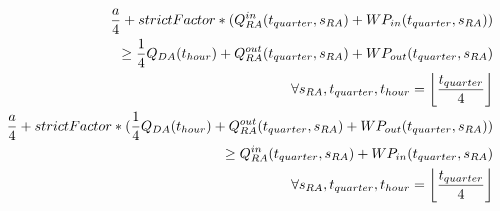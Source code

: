 \begin{alignat}{3}
	\frac{a}{4} + strictFactor * (Q^{in}_{RA}(t_{quarter}, s_{RA}) +  WP_{in}(t_{quarter}, s_{RA})) \notag                                  \\
	\geq \frac{1}{4} Q_{DA}(t_{hour})  + Q^{out}_{RA}(t_{quarter}, s_{RA}) + WP_{out}(t_{quarter}, s_{RA}) \notag                           \\
	\quad \forall s_{RA},  t_{quarter},  t_{hour} = \left\lfloor \frac{t_{quarter}}{4}\right\rfloor\label{eq:a_general_pos}                 \\
	\frac{a}{4} + strictFactor * ( \frac{1}{4}Q_{DA}(t_{hour}) +  Q^{out}_{RA}(t_{quarter}, s_{RA}) + WP_{out}(t_{quarter}, s_{RA}) )\notag \\
	\geq Q^{in}_{RA}(t_{quarter}, s_{RA}) +  WP_{in}(t_{quarter}, s_{RA}) \notag                                                            \\
	\quad \forall s_{RA},  t_{quarter},  t_{hour} = \left\lfloor \frac{t_{quarter}}{4}\right\rfloor \label{eq:a_general_neg}
\end{alignat}
